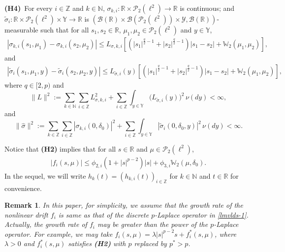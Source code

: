 \documentclass[11pt]{article}
\numberwithin{equation}{section}
\theoremstyle{plain}
\newtheorem{remark}{Remark}[section]
\begin{document}
\noindent
 {\bf(H4)}\
  For every
$i\in \mathbb{Z}$
and $k\in \mathbb{N}$,
$ \sigma_{k,i}: \mathbb{R} \times  \mathcal{P}_2(\ell^2)
\to \mathbb{R}$ is  
continuous;
and
$  \widetilde{\sigma}_{i}: \mathbb{R} \times  \mathcal{P}_2(\ell^2) \times \mathbb{Y}
\to \mathbb{R}$ is 
$(\mathcal{B}
(\mathbb{R})
\times \mathcal{B}
(\mathcal{P}_2(\ell^2))
\times \mathcal{Y}, \mathcal{B}
(\mathbb{R}) )$-measurable
such that 
 for all $s_1, s_2 \in \mathbb{R}$, $\mu_1, \mu_2 \in \mathcal{P}_2(\ell^2)$ and $y \in \mathbb{Y}$,
\begin{align} \label{sigma1}
  |\sigma_{k,i}(s_1, \mu_1) - \sigma_{k,i}(s_2, \mu_2) |
  \le L_{\sigma,k,i}
                 \left[ \left( |s_1|^{\frac{q}{2} - 1} + |s_2|^{\frac{q}{2} - 1} \right)
                        |s_1 - s_2|
                        + \mathbb{W}_2(\mu_1,\mu_2)
                 \right],
\end{align}
and 
\begin{align}\label{sigma2} |\widetilde{\sigma}_{i}(s_1, \mu_1, y) - \widetilde{\sigma}_{i}(s_2, \mu_2, y)| 
	\le L_{\tilde{\sigma},i}(y)
	 \left[ \left( |s_1|^{\frac{q}{2} - 1} + |s_2|^{\frac{q}{2} - 1} \right)
	|s_1 - s_2|
	+ \mathbb{W}_2(\mu_1,\mu_2)
	\right],
\end{align}
where $q\in [2,p)$ and
$$
\|L\|^2 
:= \sum_{k\in\mathbb{N}}\sum_{i\in\mathbb{Z}} L_{
\sigma, k,i}^2 
+ \sum_{i\in\mathbb{Z}}  \int_{y\in
\mathbb{Y}
} 
\bigl(L_{\tilde{\sigma},i}(y)\bigr)^2 \,\nu(dy) 
  <\infty,
$$
and
$$
\|\hat{\sigma}\|^2
:=  \sum_{k\in\mathbb{Z}} \sum_{i\in\mathbb{Z}}
  |\sigma_{k,i} (0,\delta_0)|^2
+  \sum_{i\in\mathbb{Z}}  \int_{ y\in \mathbb{Y}} 
|\widetilde{\sigma}_{i}(0,\delta_0,y)|^2 \,\nu (dy)
  <\infty.
 $$

 
 
 
Notice that
{\bf(H2)}  implies that
  for all $ s \in \mathbb{R} $ and $ \mu \in \mathcal{P}_2(\ell^2) $,
 \begin{align}\label{f4}
    | f_i(s,\mu) |
    \le \phi_{2,i} \left( 1 + |s|^{p-2} \right) |s|
          + \phi_{3,i} \mathbb{W}_2(\mu,\delta_0).
 \end{align}
 In the sequel, we will write 
 $h_k(t) = (h_{k,i}(t))_{i \in \mathbb{Z} }$
 for $k \in \mathbb{N}$
 and $t\in
 \mathbb{R}$
 for convenience.
 
 \begin{remark}
 In this paper, for simplicity,  
    we assume that
    the growth rate of 
   the nonlinear drift   $f_i$
  is 
    same   as that of 
    the  discrete $p$-Laplace
    operator  in \eqref{lmvlds-1}.
    Actually,  the growth rate
    of $f_i$ may be greater than
    the power   of the $p$-Laplace operator. 
    For example, we may 
    take  $f_i(s,\mu) = \lambda |s|^{p-2}s + f_i^*(s, \mu)$,
    where 
    $\lambda>0$ and $f_i^*(s, \mu)$ satisfies  {\bf(H2)} with $p$
    replaced by $p^*>p$. 
 \end{remark}
\end{document}
